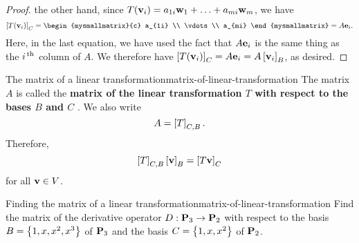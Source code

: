\begin{proof}
  the other hand, since
  $T(\mbox{\bf v}_i) = a_{1i}\mbox{\bf w}_1 + \ldots + a_{mi}\mbox{\bf w}_m$,
  we have
  \begin{equation*}
    \coord{T(\vect{v}_i)}_C =
    \begin{mysmallmatrix}{c}
      a_{1i} \\ \vdots \\ a_{mi}
    \end{mysmallmatrix}
    = A\vect{e}_i.
  \end{equation*}
  Here, in the last equation, we have used the fact that $A\mbox{\bf e}_i$
  is the same thing as the $i^{\,\rm th}$ column of $A$. We therefore have
  $\left[T(\mbox{\bf v}_i)\right]_C = A\mbox{\bf e}_i = A \left[\mbox{\bf v}_i\right]_B$, as
  desired.
\end{proof}

\begin{definition}{The matrix of a linear transformation}{matrix-of-linear-transformation}
  The matrix $A$ is called the \textbf{matrix of the linear
    transformation\/ $T$ with respect to the bases $B$ and $C$}%
  .
  We also write
  \begin{equation*}
    A = \left[T\right]_{C,B}.
  \end{equation*}
  Therefore,
  \begin{equation*}
    \left[T\right]_{C,B}\left[\mbox{\bf v}\right]_B = \left[T\mbox{\bf v}\right]_C
  \end{equation*}
  for all $\mbox{\bf v}\in V$.
\end{definition}

\begin{example}{Finding the matrix of a linear transformation}{matrix-of-linear-transformation}
  Find the matrix of the derivative operator $D:\mathbf{P}_3\to\mathbf{P}_2$
  with respect to the basis $B=\left\{1,x,x^2,x^3\right\}$ of $\mathbf{P}_3$ and the
  basis $C=\left\{1,x,x^2\right\}$ of $\mathbf{P}_2$.
\end{example}

